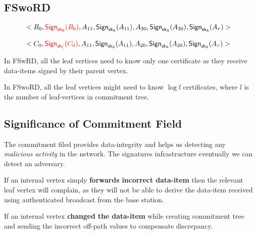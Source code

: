 \documentclass[%
  slidesonly,%
  semlayer%
  ]{seminar}                                  %
\newcommand{\sk}{\sf{sk}}
\begin{document}
\begin{slide}
    \subsection*{FSwoRD}
        \begin{equation*}
          \begin{array}{l}
            <B_{0}, \textcolor{red}{\textsf{Sign}_{\sk_{B}}(B_{0})},A_{11},\textsf{Sign}_{\sk_{A}}(A_{11}),A_{20},\textsf{Sign}_{\sk_{A}}(A_{20}),\textsf{Sign}_{\sk_{A}}(A_{\tau})>\\
              \\
            <C_{0}, \textcolor{red}{\textsf{Sign}_{\sk_{C}}(C_{0})},A_{11},\textsf{Sign}_{\sk_{A}}(A_{11}),A_{20},\textsf{Sign}_{\sk_{A}}(A_{20}),\textsf{Sign}_{\sk_{A}}(A_{\tau})>\\ 
          \end{array}
        \end{equation*}

        In FSwRD, all the leaf vertices need to know only one certificate as they receive data-items signed by their parent vertex.

        In FSwoRD, all the leaf vertices might need to know $\log l$ certificates, where $l$ is the number of leaf-vertices in commitment tree.
        \vfill
        \clearpage

    \subsection*{Significance of Commitment Field}

        The commitment filed provides data-integrity and helps us detecting any \textit{malicious activity} in the network. 
        The signatures infrastructure eventually we can detect an adversary. 

        If an internal vertex simply \textbf{forwards incorrect data-item} then the relevant leaf vertex will complain, as they will not be able to derive the data-item received using authenticated broadcast from the base station.
        
        If an internal vertex \textbf{changed the data-item} while creating commitment tree and sending the incorrect off-path values to compensate discrepancy. 
        \vfill
        \clearpage


\end{slide}
\end{document}

